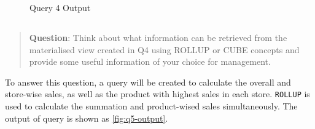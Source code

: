 \documentclass[
  a4paper,
]{article}
\begin{document}
\begin{figure}
    \centering
    \caption{Query 4 Output\label{fig:q4-output}}
\end{figure}

\hypertarget{section-4}{%
\subsection{}\label{section-4}}

\begin{quote}
\textbf{Question}: Think about what information can be retrieved from
the materialised view created in Q4 using ROLLUP or CUBE concepts and
provide some useful information of your choice for management.
\end{quote}

To answer this question, a query will be created to calculate the
overall and store-wise sales, as well as the product with highest sales
in each store. \texttt{ROLLUP} is used to calculate the summation and
product-wised sales simultaneously. The output of query is shown as
\cref{fig:q5-output}.
\end{document}
